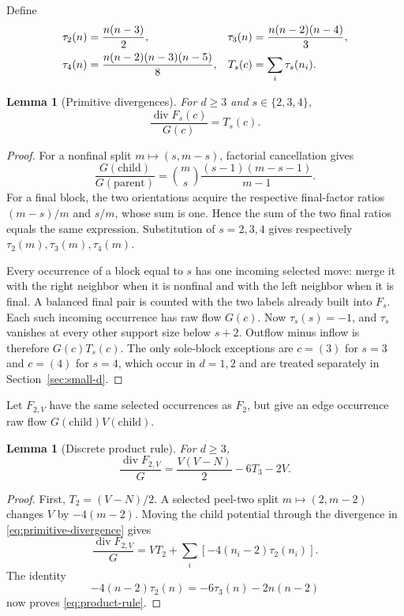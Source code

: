 \documentclass[11pt]{amsart}
\newtheorem{lemma}[theorem]{Lemma}
\theoremstyle{definition}
\theoremstyle{remark}
\newcommand{\divg}{\operatorname{div}}
\begin{document}
Define
\begin{align}
 \tau_2(n)&=\frac{n(n-3)}2,&
 \tau_3(n)&=\frac{n(n-2)(n-4)}3,\notag\\
 \tau_4(n)&=\frac{n(n-2)(n-3)(n-5)}8,&
 T_s(c)&=\sum_i\tau_s(n_i).
 \label{eq:taus}
\end{align}

\begin{lemma}[Primitive divergences]
\label{lem:primitive-divergences}
For $d\ge3$ and $s\in\{2,3,4\}$,
\begin{equation}
 \frac{\divg F_s(c)}{G(c)}=T_s(c).
 \label{eq:primitive-divergence}
\end{equation}
\end{lemma}

\begin{proof}
For a nonfinal split $m\mapsto(s,m-s)$, factorial cancellation gives
\[
 \frac{G(\text{child})}{G(\text{parent})}
 =\binom ms\frac{(s-1)(m-s-1)}{m-1}.
\]
For a final block, the two orientations acquire the respective final-factor
ratios $(m-s)/m$ and $s/m$, whose sum is one.  Hence the sum of the two
final ratios equals the same expression.  Substitution of $s=2,3,4$
gives respectively $\tau_2(m),\tau_3(m),\tau_4(m)$.

Every occurrence of a block equal to $s$ has one incoming selected move:
merge it with the right neighbor when it is nonfinal and with the left
neighbor when it is final.  A balanced final pair is counted with the two
labels already built into $F_s$.  Each such incoming occurrence has raw
flow $G(c)$.  Now $\tau_s(s)=-1$, and $\tau_s$ vanishes at every other
support size below $s+2$.  Outflow minus inflow is therefore
$G(c)T_s(c)$.  The only sole-block exceptions are $c=(3)$ for $s=3$
and $c=(4)$ for $s=4$, which occur in $d=1,2$ and are treated
separately in Section~\ref{sec:small-d}.
\end{proof}

Let $F_{2,V}$ have the same selected occurrences as $F_2$, but give an
edge occurrence raw flow $G(\text{child})V(\text{child})$.

\begin{lemma}[Discrete product rule]
\label{lem:product-rule}
For $d\ge3$,
\begin{equation}
 \frac{\divg F_{2,V}}G
 =\frac{V(V-N)}2-6T_3-2V.
 \label{eq:product-rule}
\end{equation}
\end{lemma}

\begin{proof}
First, $T_2=(V-N)/2$.  A selected peel-two split
$m\mapsto(2,m-2)$ changes $V$ by $-4(m-2)$.  Moving the child
potential through the divergence in \eqref{eq:primitive-divergence} gives
\[
 \frac{\divg F_{2,V}}G
 =VT_2+\sum_i[-4(n_i-2)\tau_2(n_i)].
\]
The identity
\[
 -4(n-2)\tau_2(n)=-6\tau_3(n)-2n(n-2)
\]
now proves \eqref{eq:product-rule}.
\end{proof}
\end{document}

